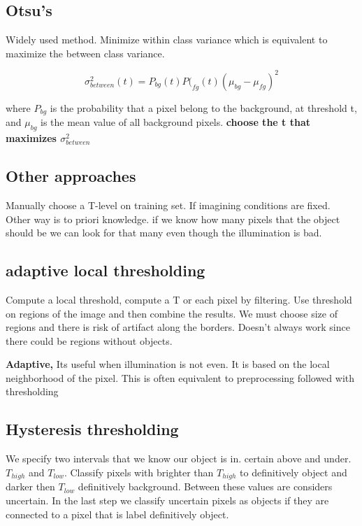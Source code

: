 \subsection*{Otsu's}
Widely used method.  Minimize within class variance which is equivalent to maximize the between class variance. 

\begin{equation}
\sigma^2_{between}(t) = P_{bg}(t) P(_{fg}(t) (\mu_{bg}-\mu_{fg})^{2}
\end{equation}

where $P_{bg}$ is the probability that a pixel belong to the background, at threshold t, and $\mu_{bg}$ is the mean value of all background pixels. \textbf{choose the t that maximizes $\sigma^2_{between}$}

\subsection*{Other approaches}
Manually choose a T-level on training set. If imagining conditions are fixed. Other way is to priori knowledge. if we know how many pixels that the object should be we can look for that many even though the illumination is bad. 

\subsection*{adaptive local thresholding}
Compute a local threshold, compute a T or each pixel by filtering. Use threshold on regions of the image and then combine the results. We must choose size of regions and there is risk of artifact along the borders. Doesn't always work since there could be regions without objects.

\textbf{Adaptive,} Its useful when illumination is not even. It is based on the local neighborhood of the pixel. This is often equivalent to preprocessing followed with thresholding 


\subsection*{Hysteresis thresholding}
We specify two intervals that we know our object is in. certain above and under. $T_{high}$ and $T_{low}$. Classify pixels with brighter than $T_{high}$ to definitively object and darker then $T_{low}$ definitively  background. Between these values are considers uncertain. In the last step we classify uncertain pixels as objects if they are connected to a pixel that is label definitively object. 


